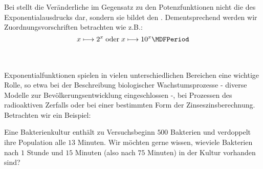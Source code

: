 \begin{MIntro}


Bei  stellt die Veränderliche im Gegensatz zu den Potenzfunktionen
nicht die  des Exponentialausdrucks dar, sondern sie bildet den . Dementsprechend werden wir Zuordnungsvorschriften betrachten wie z.B.:
$$x \longmapsto 2^x\; \text{oder}\; x \longmapsto 10^x \MDFPeriod$$

\ \\ \ \\
Exponentialfunktionen spielen in vielen unterschiedlichen Bereichen eine wichtige Rolle, so etwa bei der Beschreibung biologischer
Wachstumsprozesse - diverse Modelle zur Bevölkerungsentwicklung eingeschlossen -, bei Prozessen des radioaktiven Zerfalls
oder bei einer bestimmten Form der Zinseszinsberechnung. Betrachten wir ein Beispiel:
\begin{MExample}
Eine Bakterienkultur enthält zu Versuchsbeginn $500$ Bakterien und verdoppelt ihre Population alle $13$ Minuten. Wir möchten gerne
wissen, wieviele Bakterien nach $1$ Stunde und $15$ Minuten (also nach $75$ Minuten) in der Kultur vorhanden sind?


\end{MExample}
\end{MIntro}

